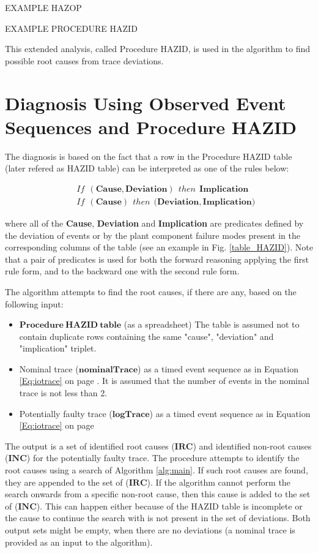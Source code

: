 \documentclass[conference]{IEEEtran}
\begin{document}
EXAMPLE HAZOP

EXAMPLE PROCEDURE HAZID 

This extended analysis, called Procedure HAZID, is used in the algorithm to find possible root causes from trace deviations.
%
\section{Diagnosis Using Observed Event Sequences and Procedure HAZID}
\label{sec:reasoning}

The diagnosis is based on the fact that a row in the Procedure HAZID
 table  (later refered as HAZID table) can be interpreted as one of the rules below:
\begin{small}
\begin{eqnarray*}
&& If~~\mathbf{(Cause,Deviation)}~~then~~\mathbf{Implication} \\
&& If~~\mathbf{(Cause)}~~then~~\mathbf{(Deviation,Implication})
\end{eqnarray*}
\end{small}
\noindent where all of the \textbf{Cause}, \textbf{Deviation} and \textbf{Implication}
 are predicates
 defined by the deviation of events or by the plant component failure modes
present in the corresponding columns of the table (see an example in Fig. \ref{table_HAZID}).
Note that a pair of predicates is used for both the forward reasoning
 applying the first rule form, and to the backward one with the second rule form.

 
The algorithm attempts to find the root causes, if there are any, based on the following input:
\begin{itemize}
	\item $\mathbf{Procedure~HAZID~table}$ (as a spreadsheet) The table is assumed not to contain duplicate rows containing the same "cause", "deviation" and "implication" triplet.
	\item Nominal trace ($\mathbf{nominalTrace}$) as a timed event sequence as in Equation \ref{Eq:iotrace} on page \pageref{Eq:iotrace}. It is assumed that the number of events in the nominal trace is not less than 2.
	\item Potentially faulty trace ($\mathbf{logTrace}$) as a timed event sequence as in Equation \ref{Eq:iotrace} on page \pageref{Eq:iotrace}
\end{itemize}

The output is a set of identified root causes ($\mathbf{IRC}$) and identified non-root causes ($\mathbf{INC}$) for the potentially faulty trace. The procedure attempts to identify the root causes using a search of Algorithm \ref{alg:main}. If such root causes are found, they are appended to the set of ($\mathbf{IRC}$). If the algorithm cannot perform the search onwards from a specific non-root cause, then this cause is added to the set of ($\mathbf{INC}$). This can happen either because of the HAZID table is incomplete or the cause to continue the search with is not present in the set of deviations. Both output sets might be empty, when there are no deviations (a nominal trace is provided as an input to the algorithm).
\end{document}
